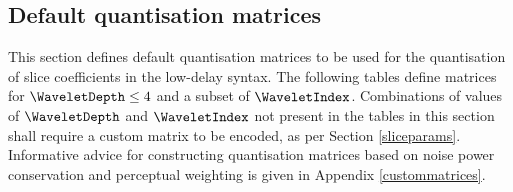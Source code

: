 \label{quantmatrices}

\subsection{Default quantisation matrices}
\label{defaultquantmatrices}

This section defines default quantisation matrices to be used 
for the quantisation of slice coefficients in the low-delay syntax.
The following tables define matrices for $\WaveletDepth\leq 4$ 
and a subset of $\WaveletIndex$. Combinations of values of 
$\WaveletDepth$ and $\WaveletIndex$ not present in the tables
in this section shall require a custom matrix to be encoded, 
as per Section \ref{sliceparams}. Informative advice for 
constructing quantisation matrices based on noise power 
conservation and perceptual weighting is given in 
Appendix \ref{custommatrices}.

